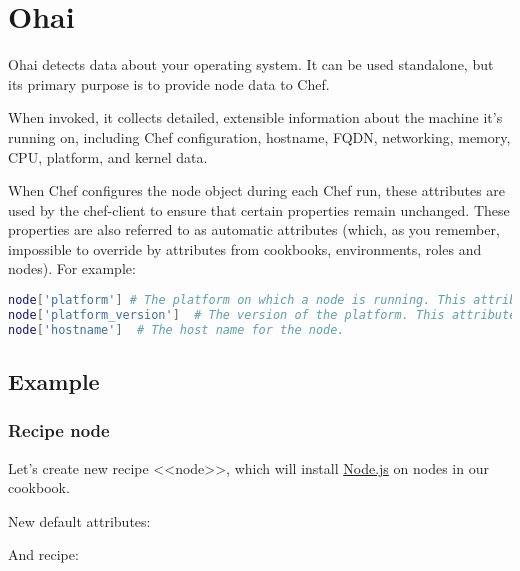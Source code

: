 \section{Ohai}

Ohai detects data about your operating system. It can be used standalone, but its primary purpose is to provide node data to Chef.

When invoked, it collects detailed, extensible information about the machine it's running on, including Chef configuration, hostname, FQDN, networking, memory, CPU, platform, and kernel data.

When Chef configures the node object during each Chef run, these attributes are used by the chef-client to ensure that certain properties remain unchanged. These properties are also referred to as automatic attributes (which, as you remember, impossible to override by attributes from cookbooks, environments, roles and nodes). For example:

\begin{lstlisting}[language=Bash,label=lst:cookbook-ohai1]
node['platform'] # The platform on which a node is running. This attribute helps determine which providers will be used.
node['platform_version']  # The version of the platform. This attribute helps determine which providers will be used.
node['hostname']  # The host name for the node.
\end{lstlisting}

\subsection{Example}

\subsubsection{Recipe node}

Let's create new recipe <<node>>, which will install \href{http://nodejs.org/}{Node.js} on nodes in our  cookbook.

New default attributes:



And recipe:



